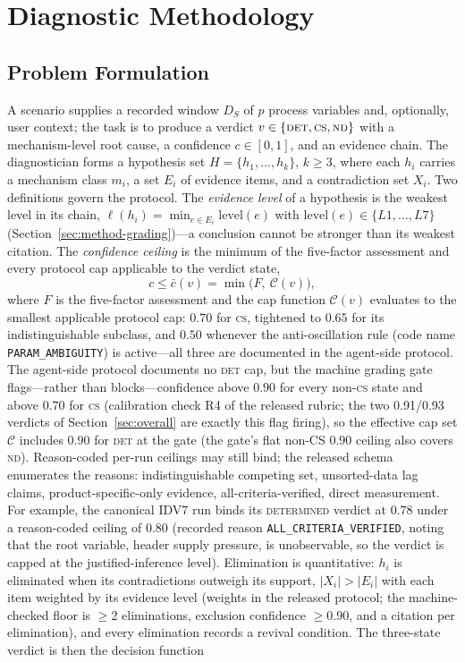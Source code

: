 \documentclass[preprint,12pt]{elsarticle}
\begin{document}
\section{Diagnostic Methodology}
\label{sec:method}

\subsection{Problem Formulation}
A scenario supplies a recorded window $D_S$ of $p$ process variables and, optionally, user context; the task is to produce a verdict $v \in \{\textsc{det},\textsc{cs},\textsc{nd}\}$ with a mechanism-level root cause, a confidence $c \in [0,1]$, and an evidence chain. The diagnostician forms a hypothesis set $H = \{h_1,\dots,h_k\}$, $k \ge 3$, where each $h_i$ carries a mechanism class $m_i$, a set $E_i$ of evidence items, and a contradiction set $X_i$. Two definitions govern the protocol. The \emph{evidence level} of a hypothesis is the weakest level in its chain, $\ell(h_i) = \min_{e \in E_i} \mathrm{level}(e)$ with $\mathrm{level}(e) \in \{L1,\dots,L7\}$ (Section~\ref{sec:method-grading})---a conclusion cannot be stronger than its weakest citation. The \emph{confidence ceiling} is the minimum of the five-factor assessment and every protocol cap applicable to the verdict state,
\begin{equation}
c \le \bar{c}(v) = \min\bigl(F,\ \mathcal{C}(v)\bigr),
\label{eq:ceiling}
\end{equation}
where $F$ is the five-factor assessment and the cap function $\mathcal{C}(v)$ evaluates to the smallest applicable protocol cap: $0.70$ for \textsc{cs}, tightened to $0.65$ for its indistinguishable subclass, and $0.50$ whenever the anti-oscillation rule (code name \texttt{PARAM\_AMBIGUITY}) is active---all three are documented in the agent-side protocol. The agent-side protocol documents no \textsc{det} cap, but the machine grading gate flags---rather than blocks---confidence above $0.90$ for every non-\textsc{cs} state and above $0.70$ for \textsc{cs} (calibration check R4 of the released rubric; the two 0.91/0.93 verdicts of Section~\ref{sec:overall} are exactly this flag firing), so the effective cap set $\mathcal{C}$ includes $0.90$ for \textsc{det} at the gate (the gate's flat non-CS $0.90$ ceiling also covers \textsc{nd}). Reason-coded per-run ceilings may still bind; the released schema enumerates the reasons: indistinguishable competing set, unsorted-data lag claims, product-specific-only evidence, all-criteria-verified, direct measurement. For example, the canonical IDV7 run binds its \mbox{\textsc{determined}} verdict at $0.78$ under a reason-coded ceiling of $0.80$ (recorded reason \texttt{ALL\_CRITERIA\_VERIFIED}, noting that the root variable, header supply pressure, is unobservable, so the verdict is capped at the justified-inference level). Elimination is quantitative: $h_i$ is eliminated when its contradictions outweigh its support, $|X_i| > |E_i|$ with each item weighted by its evidence level (weights in the released protocol; the machine-checked floor is $\ge$2 eliminations, exclusion confidence $\ge 0.90$, and a citation per elimination), and every elimination records a revival condition. The three-state verdict is then the decision function
\end{document}
